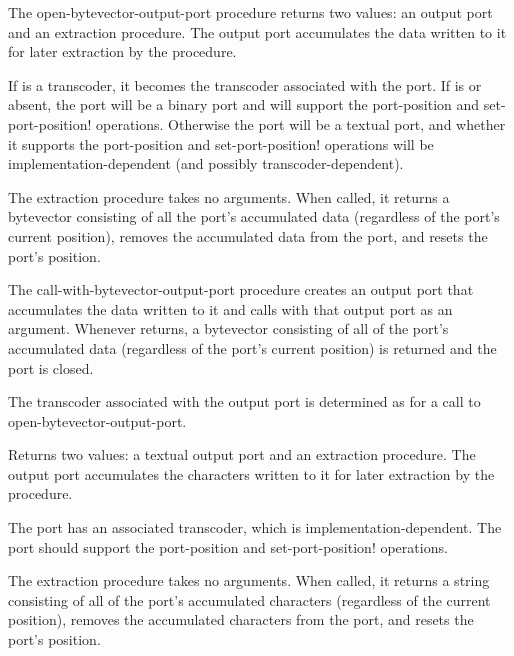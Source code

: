 \begin{entry}{%
}


The {\cf open-bytevector-output-port} procedure returns 
two values: an output port and an extraction procedure.
The output port accumulates the data written to it for
later extraction by the procedure.

If  is a transcoder, it becomes
the transcoder associated with the port.
If  is \schfalse{} or absent,
the port will be a binary port and will support the
{\cf port-position} and {\cf set-port-position!}  operations.
Otherwise the port will be a textual port, and whether it supports
the {\cf port-position} and {\cf set-port-position!} operations
will be implementation-dependent (and possibly transcoder-dependent).

The extraction procedure takes no arguments.
When called, it returns a
bytevector consisting of all the port's accumulated data (regardless
of the port's current position), removes
the accumulated data from the port, and resets the port's position.
\end{entry}

\begin{entry}{%
}


The {\cf call-with-bytevector-output-port} procedure creates an output
port that accumulates the data written to it and calls  with
that output port as an argument. Whenever  returns, a
bytevector consisting of all of the port's accumulated data (regardless
of the port's current position) is returned and
the port is closed.

The transcoder associated with the output port is determined
as for a call to {\cf open-bytevector-output-port}.
\end{entry}

\begin{entry}{%
}

Returns two values: a textual output port and an extraction procedure.
The output port accumulates the characters written to it for
later extraction by the procedure.

The port has an associated transcoder, which is
implementation-dependent.  The port should support the {\cf
  port-position} and {\cf set-port-position!} operations.

The extraction procedure takes no arguments.
When called, it returns a string consisting of all of the port's
accumulated characters (regardless of the current position),
removes the accumulated characters from the port, and resets
the port's position.
\end{entry}

